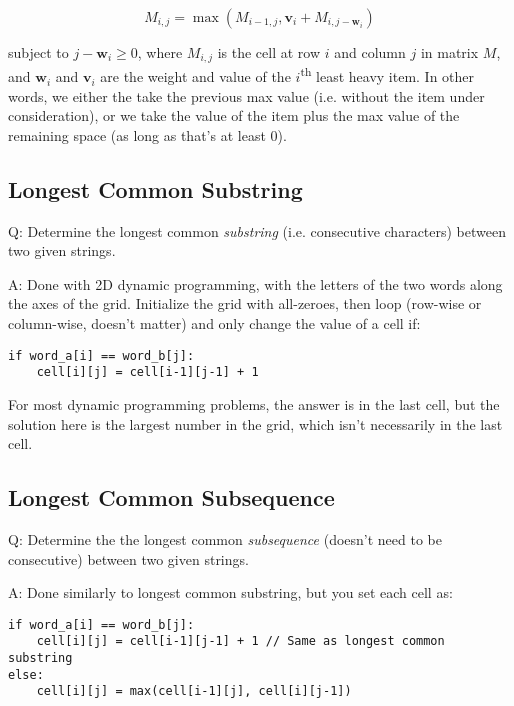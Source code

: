 \documentclass[8pt, table, xcdraw]{article}%
\begin{document}
\begin{equation*}
    M_{i,j} = \max(M_{i-1,j}, \mathbf{v}_i + M_{i,j-\mathbf{w}_i})
\end{equation*}

subject to $j-\mathbf{w}_i \geq 0$, where $M_{i,j}$ is the cell at row $i$ and column $j$ in matrix $M$, and $\mathbf{w}_i$ and $\mathbf{v}_i$ are the weight and value of the $i$\textsuperscript{th} least heavy item. In other words, we either the take the previous max value (i.e. without the item under consideration), or we take the value of the item plus the max value of the remaining space (as long as that's at least $0$).

\subsection{Longest Common Substring}

Q: Determine the longest common \emph{substring} (i.e. consecutive characters) between two given strings.

A: Done with 2D dynamic programming, with the letters of the two words along the axes of the grid. Initialize the grid with all-zeroes, then loop (row-wise or column-wise, doesn't matter) and only change the value of a cell if:

\begin{lstlisting}
if word_a[i] == word_b[j]:
    cell[i][j] = cell[i-1][j-1] + 1
\end{lstlisting}

For most dynamic programming problems, the answer is in the last cell, but the solution here is the largest number in the grid, which isn't necessarily in the last cell.

\subsection{Longest Common Subsequence}

Q: Determine the the longest common \emph{subsequence} (doesn't need to be consecutive) between two given strings.

A: Done similarly to longest common substring, but you set each cell as:

\begin{lstlisting}
if word_a[i] == word_b[j]:
    cell[i][j] = cell[i-1][j-1] + 1 // Same as longest common substring
else:
    cell[i][j] = max(cell[i-1][j], cell[i][j-1])
\end{lstlisting}
\end{document}
